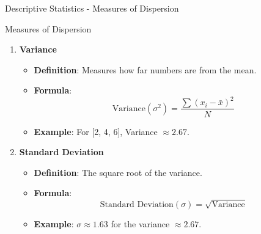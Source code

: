 \documentclass[aspectratio=169]{beamer}
\begin{document}
\begin{frame}[fragile]{Descriptive Statistics - Measures of Dispersion}
    \begin{block}{Measures of Dispersion}
        \begin{enumerate}
            \item \textbf{Variance}
                \begin{itemize}
                    \item \textbf{Definition}: Measures how far numbers are from the mean.
                    \item \textbf{Formula}:
                        \begin{equation}
                        \text{Variance} (\sigma^2) = \frac{\sum{(x_i - \bar{x})^2}}{N}
                        \end{equation}
                    \item \textbf{Example}: For [2, 4, 6], Variance $\approx 2.67$.
                \end{itemize}
                
            \item \textbf{Standard Deviation}
                \begin{itemize}
                    \item \textbf{Definition}: The square root of the variance.
                    \item \textbf{Formula}:
                        \begin{equation}
                        \text{Standard Deviation} (\sigma) = \sqrt{\text{Variance}}
                        \end{equation}
                    \item \textbf{Example}: $\sigma \approx 1.63$ for the variance $\approx 2.67$.
                \end{itemize}
        \end{enumerate}
    \end{block}
\end{frame}
\end{document}
